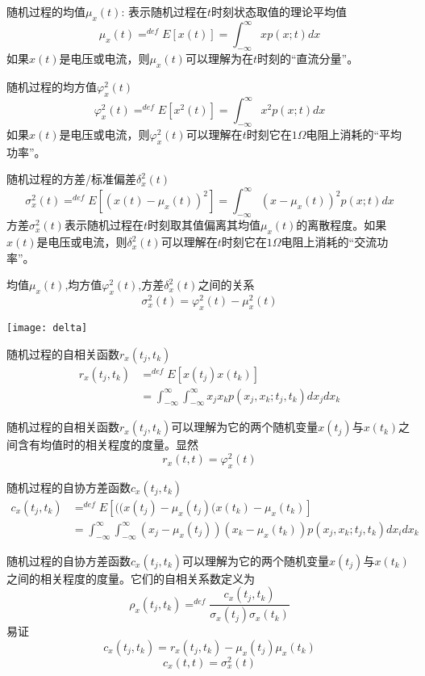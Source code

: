 \begin{frame}
\begin{block}{随机过程的均值$\mu_x(t)$: 表示随机过程在$t$时刻状态取值的理论平均值}
	\[\mu_x(t)\mathop{=}^{def}E[x(t)]=\int_{-\infty}^{\infty}xp(x;t)dx \]
	如果$x(t)$是电压或电流，则$\mu_x(t)$可以理解为在$t$时刻的``直流分量''。
\end{block}

\begin{block}{随机过程的均方值$\varphi_x^2(t)$}
	\[\varphi_x^2(t)\mathop{=}^{def}E[x^2(t)]=\int_{-\infty}^{\infty}x^2p(x;t)dx \]
	如果$x(t)$是电压或电流，则$\varphi_x^2(t)$可以理解在$t$时刻它在$1\Omega$电阻上消耗的``平均功率''。
\end{block}
\end{frame}

\begin{frame}
\begin{block}{随机过程的方差/标准偏差$\delta_x^2(t)$}
\[\sigma_x^2(t)\mathop{=}^{def}E[(x(t)-\mu_x(t))^2]=\int_{-\infty}^{\infty}(x-\mu_x(t))^2p(x;t)dx \]
方差$\sigma_x^2(t)$表示随机过程在$t$时刻取其值偏离其均值$\mu_x(t)$的离散程度。如果$x(t)$是电压或电流，则$\delta_x^2(t)$可以理解在$t$时刻它在$1\Omega$电阻上消耗的``交流功率''。
\end{block}
\begin{block}{均值$\mu_x(t)$,均方值$\varphi_x^2(t)$,方差$\delta_x^2(t)$之间的关系}
\[\sigma_x^2(t)=\varphi_x^2(t)-\mu_x^2(t)\]
\end{block}
\texttt{[image: delta]}
\end{frame}

\begin{frame}
\begin{block}{随机过程的自相关函数$r_x(t_j,t_k)$}
\begin{align*}
r_x(t_j,t_k)&\mathop{=}^{def}E[x(t_j)x(t_k)]\\
&=\int_{-\infty}^{\infty}	\int_{-\infty}^{\infty}x_jx_kp(x_j,x_k;t_j,t_k)dx_jdx_k
\end{align*}
\end{block}
随机过程的自相关函数$r_x(t_j,t_k)$可以理解为它的两个随机变量$x(t_j)$与$x(t_k)$之间含有均值时的相关程度的度量。显然
\[r_x(t,t)=\varphi_x^2(t)\]
\end{frame}

\begin{frame}
\begin{block}{随机过程的自协方差函数$c_x(t_j,t_k)$}
\begin{align*}
c_x(t_j,t_k)&\mathop{=}^{def}E[((x(t_j)-\mu_x(t_j)(x(t_k)-\mu_x(t_k)]\\
&=\int_{-\infty}^{\infty}\int_{-\infty}^{\infty}(x_j-\mu_x(t_j))(x_k-\mu_x(t_k))p(x_j,x_k;t_j,t_k)dx_idx_k
\end{align*}
\end{block}
随机过程的自协方差函数$c_x(t_j,t_k)$可以理解为它的两个随机变量$x(t_j)$与$x(t_k)$之间的相关程度的度量。它们的自相关系数定义为
\[\rho_x(t_j,t_k)\mathop{=}^{def}\frac{c_x(t_j,t_k)}{\sigma_x(t_j)\sigma_x(t_k)}\]
易证
\[c_x(t_j,t_k)=r_x(t_j,t_k)-\mu_x(t_j)\mu_x(t_k)\]
\[c_x(t,t)=\sigma_x^2(t)\]
\end{frame}

